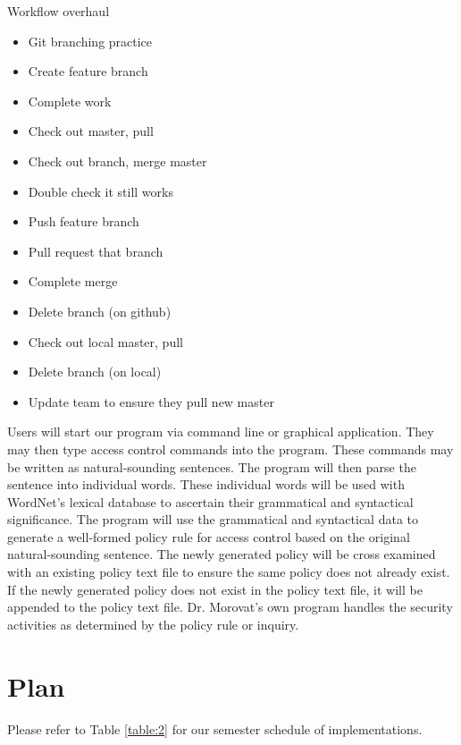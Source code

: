 \documentclass[12pt]{article}
\begin{document}
Workflow overhaul
\begin{itemize}
    \item Git branching practice
    \item Create feature branch
    \item Complete work
    \item Check out master, pull
    \item Check out branch, merge master
    \item Double check it still works
    \item Push feature branch
    \item Pull request that branch
    \item Complete merge
    \item Delete branch (on github)
    \item Check out local master, pull
    \item Delete branch (on local)
    \item Update team to ensure they pull new master
\end{itemize}

Users will start our program via command line or graphical application. They may then type access control commands into the program. These commands may be written as natural-sounding sentences. The program will then parse the sentence into individual words. These individual words will be used with WordNet’s lexical database to ascertain their grammatical and syntactical significance. The program will use the grammatical and syntactical data to generate a well-formed policy rule for access control based on the original natural-sounding sentence. The newly generated policy will be cross examined with an existing policy text file to ensure the same policy does not already exist. If the newly generated policy does not exist in the policy text file, it will be appended to the policy text file. Dr. Morovat’s own program handles the security activities as determined by the policy rule or inquiry.

\section{Plan}

Please refer to Table \ref{table:2} for our semester schedule of implementations.
\end{document}
